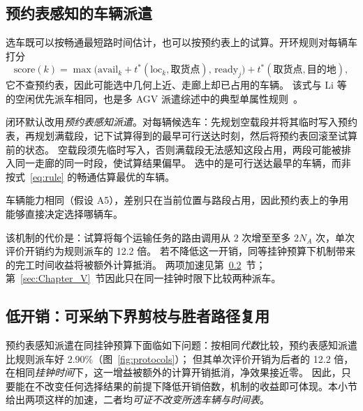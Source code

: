 \documentclass[manuscript,screen,review]{acmart}
\newcommand{\CostMultBefore}{12.2}
\newcommand{\GainProbeSameGen}{2.90\%}
\begin{document}
\subsection{预约表感知的车辆派遣}
\label{sec:dispatch}

选车既可以按畅通最短路时间估计，也可以按预约表上的试算。开环规则对每辆车打分
\begin{equation}
\label{eq:rule}
\mathrm{score}(k)=\max\bigl(\mathrm{avail}_k+t^{*}(\mathrm{loc}_k,\text{取货点}),\,
\mathrm{ready}_j\bigr)+t^{*}(\text{取货点},\text{目的地}),
\end{equation}
它不查预约表，因此可能选中几何上近、走廊上却已占用的车辆。
该式与 Li 等~\cite{li2026framework} 的空闲优先派车相同，也是多 AGV 派遣综述中的典型单属性规则~\cite{lu2022agv}。

闭环默认改用\emph{预约表感知派遣}。对每辆候选车：先规划空载段并将其临时写入预约表，再规划满载段，记下试算得到的最早可行送达时刻，然后将预约表回滚至试算前的状态。
空载段须先临时写入，否则满载段无法感知这段占用，两段可能被排入同一走廊的同一时段，使试算结果偏早。
选中的是可行送达最早的车辆，而非按式~\eqref{eq:rule} 的畅通估算最优的车辆。

车辆能力相同（假设 A5），差别只在当前位置与路段占用，因此预约表上的争用能够直接决定选择哪辆车。

该机制的代价是：试算将每个运输任务的路由调用从 $2$ 次增至至多 $2N_A$ 次，单次评价开销约为规则派车的 \CostMultBefore{} 倍。
若不降低这一开销，同等挂钟预算下机制带来的完工时间收益将被额外计算抵消。
两项加速见第~\ref{sec:speedup}~节；第~\ref{sec:Chapter_V}~节因此只在同一挂钟时限下比较两种派车。

\subsection{低开销：可采纳下界剪枝与胜者路径复用}
\label{sec:speedup}

预约表感知派遣在同挂钟预算下面临如下问题：按相同\emph{代数}比较，预约表感知派遣比规则派车好 \GainProbeSameGen{}（图~\ref{fig:protocols}）；
但其单次评价开销为后者的 \CostMultBefore{} 倍，在相同\emph{挂钟时间}下，这一增益被额外的计算开销抵消，净效果接近零。
因此，只要能在不改变任何选择结果的前提下降低开销倍数，机制的收益即可体现。本小节给出两项这样的加速，二者均\emph{可证不改变所选车辆与时间表}。
\end{document}

